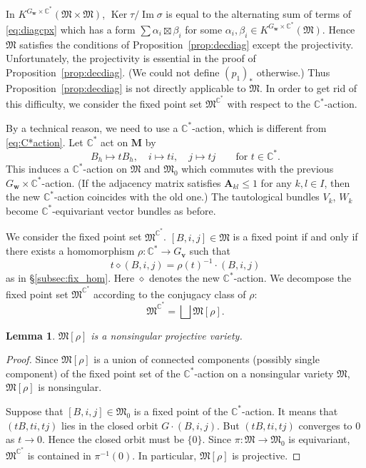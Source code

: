 \documentclass[12pt]{amsart}
\def\Bbb{\mathbb}
\def\frak{\mathfrak}
\newtheorem{Lemma}[equation]{Lemma}
\theoremstyle{definition}
\theoremstyle{remark}
\numberwithin{equation}{subsection}
\newcommand{\propref}[1]{Proposition~\ref{#1}}
\newcommand{\subsecref}[1]{\S\ref{#1}}
\newcommand{\C}{{\Bbb C}}
\newcommand{\Ker}{\operatorname{Ker}}
\newcommand{\Ima}{\operatorname{Im}}
\newcommand{\bM}{{\mathbf M}} %
\newcommand{\M}{{\frak M}} %
\newcommand{\bv}{{\mathbf v}} %
\newcommand{\bw}{{\mathbf w}} %
\newcommand{\bA}{{\mathbf A}} %
\begin{document}
In $K^{G_\bw\times\C^*}(\M\times\M)$, $\Ker\tau/\Ima\sigma$ is equal
to the alternating sum of terms of \eqref{eq:diagcpx} which has a form
$\sum \alpha_i \boxtimes \beta_i$ for some $\alpha_i,\beta_i\in
K^{G_\bw\times\C^*}(\M)$. Hence $\M$ satisfies the conditions of
\propref{prop:decdiag} except the projectivity.  Unfortunately, the
projectivity is essential in the proof of \propref{prop:decdiag}. (We
could not define $(p_1)_*$ otherwise.) Thus \propref{prop:decdiag} is
not directly applicable to $\M$. In order to get rid of this
difficulty, we consider the fixed point set $\M^{\C^*}$ with respect
to the $\C^*$-action.

By a technical reason, we need to use a $\C^*$-action, which is
different from \eqref{eq:C*action}. Let $\C^*$ act on $\bM$ by
\begin{equation}\label{eq:newC*action}
B_{h} \mapsto t B_{h}, \quad i \mapsto t i, \quad j \mapsto t j \qquad
\text{for $t\in \C^*$}.
\end{equation}
This induces a $\C^*$-action on $\M$ and $\M_0$ which commutes with
the previous $G_\bw\times\C^*$-action.
(If the adjacency matrix satisfies $\bA_{kl} \le 1$ for any $k, l\in I$,
then the new $\C^*$-action coincides with the old one.)
The tautological bundles $V_k$, $W_k$ become $\C^*$-equivariant vector
bundles as before.

We consider the fixed point set $\M^{\C^*}$. $[B,i,j]\in\M$ is a fixed
point if and only if there exists a homomorphism $\rho\colon
\C^*\to G_\bv$ such that
\begin{equation*}
  t\diamond (B,i,j) = \rho(t)^{-1}\cdot (B,i,j)
\end{equation*}
as in \subsecref{subsec:fix_hom}.
Here $\diamond$ denotes the new $\C^*$-action.
We decompose the fixed point set $\M^{\C^*}$ according to the
conjugacy class of $\rho$:
\begin{equation*}
\M^{\C^*} = \bigsqcup \M[\rho].  
\end{equation*}


\begin{Lemma}
$\M[\rho]$ is a nonsingular projective variety.
\end{Lemma}

\begin{proof}
Since $\M[\rho]$ is a union of connected components (possibly single
component) of the fixed point set of the $\C^*$-action on a
nonsingular variety $\M$, $\M[\rho]$ is nonsingular.

Suppose that $[B,i,j]\in \M_0$ is a fixed point of the
$\C^*$-action. It means that $(tB, ti, tj)$ lies in the closed orbit
$G\cdot(B,i,j)$. But $(tB,ti,tj)$ converges to $0$ as $t\to 0$. Hence
the closed orbit must be $\{0\}$. Since $\pi\colon\M\to\M_0$ is
equivariant, $\M^{\C^*}$ is contained in $\pi^{-1}(0)$. In particular,
$\M[\rho]$ is projective.
\end{proof}
\end{document}

